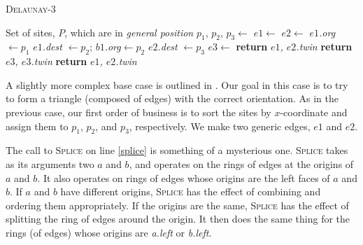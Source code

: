 \documentclass[12pt,twoside]{reedthesis}
\begin{document}
    \begin{algorithm}[!htb]
    \caption{\textsc{Delaunay-3}}\label{bc_del_3}
    \begin{algorithmic}[1]
    \Require Set of sites, $P$, which are in \emph{general position}
      \State $p_{1}$, $p_{2}$, $p_{3}\gets$ \label{sort_2}
      \State $e1\gets$
      \State $e2\gets$
      \State {} \label{splice}
      \State \textit{$e1$.org} $\gets p_{1}$
      \State \textit{$e1$.dest} $\gets p_{2}$; \textit{$b1$.org}$\gets p_{2}$
      \State \textit{$e2$.dest} $\gets p_{3}$
      \State $e3\gets$
       
        \State \textbf{return} \textit{$e1$, $e2$.twin}
        \State \textbf{return} \textit{$e3$, $e3$.twin}
      \Else {}
        \State \textbf{return} \textit{$e1$, $e2$.twin} \label{return_2}
      \EndIf
    \EndProcedure
    \end{algorithmic} 
    \end{algorithm}
    \newpage
    A slightly more complex base case is outlined in . Our goal in this case is to try to form a triangle (composed of edges) with the correct orientation.  As in the previous case, our first order of business is to sort the sites by $x$-coordinate and assign them to $p_{1}$, $p_{2}$, and $p_{3}$, respectively. We make two generic edges, $e1$ and $e2$. \par

    The call to \textsc{Splice} on line \ref{splice} is something of a mysterious one. \textsc{Splice} takes as its arguments two $a$ and $b$, and operates on the rings of edges at the origins of $a$ and $b$. It also operates on rings of edges whose origins are the left faces of $a$ and $b$. If $a$ and $b$ have different origins, \textsc{Splice} has the effect of combining and ordering them appropriately. If the origins are the same, \textsc{Splice} has the effect of splitting the ring of edges around the origin. It then does the same thing for the rings (of edges) whose origins are \textit{a.left} or \textit{b.left}. \par
\end{document}
